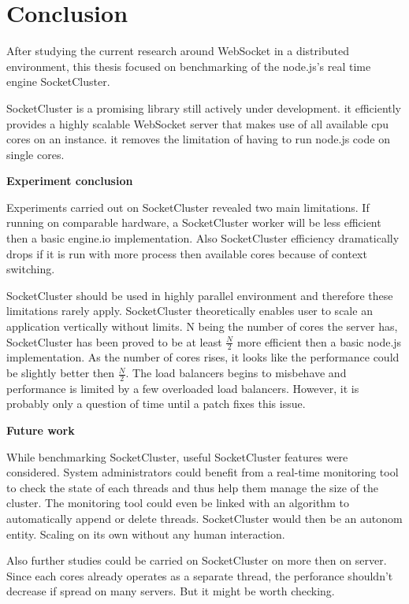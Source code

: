 
\chapter{Conclusion} 
\label{Chapter4} 

After studying the current research around WebSocket in a distributed
environment, this thesis focused on benchmarking of the node.js's real time
engine SocketCluster.

SocketCluster is a promising library still actively under development.
it efficiently provides a highly scalable WebSocket server that makes
use of all available cpu cores on an instance. it removes the limitation
of having to run node.js code on single cores.

\textbf{Experiment conclusion}

Experiments carried out on SocketCluster revealed two main limitations.  If
running on comparable hardware, a SocketCluster worker will be less efficient
then a basic engine.io implementation. Also SocketCluster efficiency
dramatically drops if it is run with more process then available cores because
of context switching.

SocketCluster should be used in highly parallel environment and
therefore these limitations rarely apply. SocketCluster theoretically  enables
user to scale an application vertically  without limits. N being the number of
cores the server has, SocketCluster has been proved to be at least
$\frac{N}{2}$ more efficient then a basic node.js implementation.  As the
number of cores rises, it looks like the performance could be slightly better
then $\frac{N}{2}$. The load balancers begins to misbehave and performance
is limited by a few overloaded load balancers. However, it is probably only a
question of time until a patch fixes this issue.

\newpage
\textbf{Future work}

While benchmarking SocketCluster, useful SocketCluster features were
considered.  System administrators could benefit from a real-time monitoring tool
to check the state of each threads and thus help them manage the size of the
cluster. The monitoring tool could even be linked with an algorithm to
automatically append or delete threads.  SocketCluster would then be an autonom
entity. Scaling on its own without any human interaction.

Also further studies could be carried on SocketCluster on more then on server.
Since each cores already operates as a separate thread, the perforance
shouldn't decrease if spread on many servers. But it might be worth checking.
















